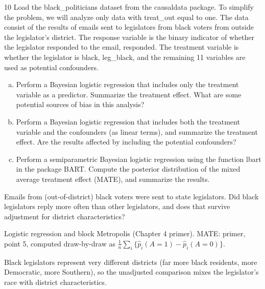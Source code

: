 \documentclass[11pt]{article}
\begin{document}
\begin{problem}{10}
Load the black\_politicians dataset from the causaldata package. To simplify the problem, we will analyze only data with treat\_out equal to one. The data consist of the results of emails sent to legislators from black voters from outside the legislator's district. The response variable is the binary indicator of whether the legislator responded to the email, responded. The treatment variable is whether the legislator is black, leg\_black, and the remaining 11 variables are used as potential confounders.
\begin{enumerate}[(a)]
\item Perform a Bayesian logistic regression that includes only the treatment variable as a predictor. Summarize the treatment effect. What are some potential sources of bias in this analysis?
\item Perform a Bayesian logistic regression that includes both the treatment variable and the confounders (as linear terms), and summarize the treatment effect. Are the results affected by including the potential confounders?
\item Perform a semiparametric Bayesian logistic regression using the function lbart in the package BART. Compute the posterior distribution of the mixed average treatment effect (MATE), and summarize the results.
\end{enumerate}
\end{problem}

\begin{restate}
Emails from (out-of-district) black voters were sent to state legislators. Did black legislators reply more often than other legislators, and does that survive adjustment for district characteristics?
\end{restate}

\begin{recall}
Logistic regression and block Metropolis (Chapter 4 primer). MATE: primer, point 5, computed draw-by-draw as $\frac1n\sum_i\{\hat p_i(A=1)-\hat p_i(A=0)\}$.
\end{recall}

\begin{keyidea}
Black legislators represent very different districts (far more black residents, more Democratic, more Southern), so the unadjusted comparison mixes the legislator's race with district characteristics.
\end{keyidea}
\end{document}

